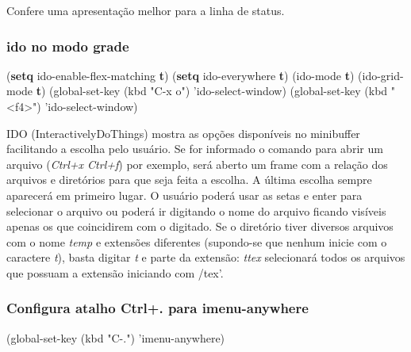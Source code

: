 \documentclass[]{article}
\newenvironment{Shaded}{}{}
\newcommand{\KeywordTok}[1]{\textcolor[rgb]{0.00,0.44,0.13}{\textbf{{#1}}}}
\newcommand{\StringTok}[1]{\textcolor[rgb]{0.25,0.44,0.63}{{#1}}}
\newcommand{\NormalTok}[1]{{#1}}
\begin{document}
Confere uma apresentação melhor para a linha de status.

\subsubsection{ido no modo grade}\label{ido-no-modo-grade}

\begin{Shaded}
\begin{Highlighting}[]
\NormalTok{(}\KeywordTok{setq} \NormalTok{ido-enable-flex-matching }\KeywordTok{t}\NormalTok{)}
\NormalTok{(}\KeywordTok{setq} \NormalTok{ido-everywhere }\KeywordTok{t}\NormalTok{)}
\NormalTok{(ido-mode }\KeywordTok{t}\NormalTok{)}
\NormalTok{(ido-grid-mode }\KeywordTok{t}\NormalTok{)}
\NormalTok{(global-set-key (kbd }\StringTok{"C-x o"}\NormalTok{) 'ido-select-window)}
\NormalTok{(global-set-key (kbd }\StringTok{"<f4>"}\NormalTok{) 'ido-select-window)}
\end{Highlighting}
\end{Shaded}

IDO (InteractivelyDoThings) mostra as opções disponíveis no minibuffer
facilitando a escolha pelo usuário. Se for informado o comando para
abrir um arquivo (\emph{Ctrl+x Ctrl+f}) por exemplo, será aberto um
frame com a relação dos arquivos e diretórios para que seja feita a
escolha. A última escolha sempre aparecerá em primeiro lugar. O usuário
poderá usar as setas e enter para selecionar o arquivo ou poderá ir
digitando o nome do arquivo ficando visíveis apenas os que coincidirem
com o digitado. Se o diretório tiver diversos arquivos com o nome
\emph{temp} e extensões diferentes (supondo-se que nenhum inicie com o
caractere \emph{t}), basta digitar \emph{t} e parte da extensão:
\emph{ttex} selecionará todos os arquivos que possuam a extensão
iniciando com /tex'.

\subsubsection{\texorpdfstring{Configura atalho \textbf{Ctrl+.} para
imenu-anywhere}{Configura atalho Ctrl+. para imenu-anywhere}}\label{configura-atalho-ctrl.-para-imenu-anywhere}

\begin{Shaded}
\begin{Highlighting}[]
\NormalTok{(global-set-key (kbd }\StringTok{"C-."}\NormalTok{) 'imenu-anywhere)}
\end{Highlighting}
\end{Shaded}
\end{document}
